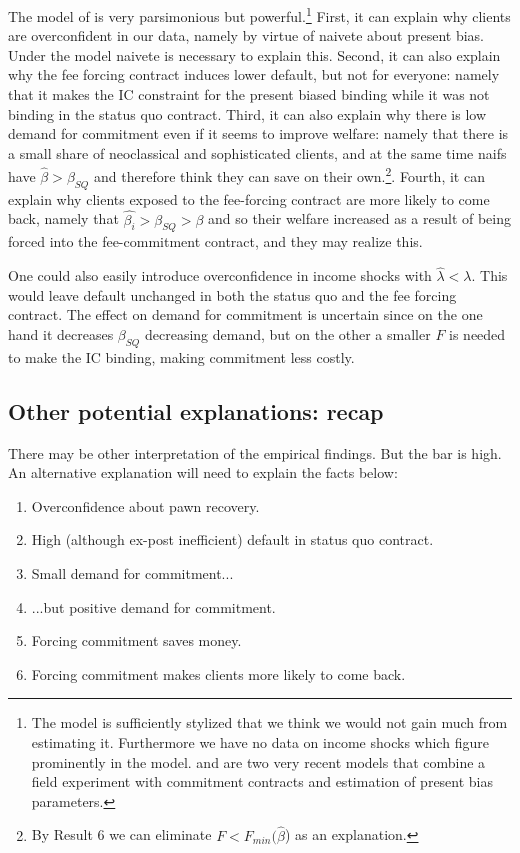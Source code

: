 \documentclass[11pt]{article}
\begin{document}
The model of \cite{John} is very parsimonious but powerful.\footnote{The model is sufficiently stylized that we think we would not gain much from estimating it. Furthermore we have no data on income shocks which figure prominently in the model. \cite{Ted} and \cite{Aprajit} are two very recent models that combine a field experiment with commitment contracts and estimation of present bias parameters.} First, it can explain why clients are overconfident in our data, namely by virtue of naivete about present bias. Under the model naivete is necessary to explain this. Second, it can also explain why the fee forcing contract induces lower default, but not for everyone: namely that it makes the IC constraint for the present biased binding while it was not binding in the status quo contract. Third, it can also explain why there is low demand for commitment even if it seems to improve welfare: namely that there is a small share of neoclassical and sophisticated clients, and at the same time naifs have  $\hat{\beta}>\beta_{SQ}$ and therefore think they can save on their own.\footnote{By Result 6 we can eliminate $F<F_{min}(\widehat{\beta}$) as an explanation.}. Fourth, it can explain why clients exposed to the fee-forcing contract are more likely to come back, namely that $\hat{\beta_i}>\beta_{SQ}>\beta$ and so their welfare increased as a result of being forced into the fee-commitment contract, and they may realize this.

One could also easily introduce overconfidence in income shocks with $\widehat{\lambda} <\lambda$. This would leave default unchanged in both the status quo and the fee forcing contract. %
The effect on demand for commitment is uncertain since on the one hand it decreases $\beta_{SQ}$ decreasing demand, but on the other a smaller $F$ is needed to make the IC binding, making commitment less costly.


\subsection{Other potential explanations: recap} \label{explanations_recap}

There may be other interpretation of the empirical findings. But the bar is high. An alternative explanation will need to explain the facts below:

\begin{enumerate}
\itemsep0em 
\item Overconfidence about pawn recovery.
\item High (although ex-post inefficient) default in status quo contract.
\item Small demand for commitment...
\item ...but positive demand for commitment.
\item Forcing commitment saves money.
\item Forcing commitment makes clients more likely to come back.
\end{enumerate}
\end{document}
